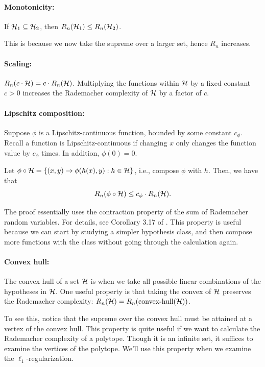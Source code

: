 \paragraph{Monotonicity:} If $\mathcal{H}_1 \subseteq \mathcal{H}_2$, then $R_n(\mathcal{H}_1) \le R_n(\mathcal{H}_2)$.

This is because we now take the supreme over a larger set, hence $R_n$ increases.

\paragraph{Scaling:} $R_n(c\cdot \mathcal{H}) = c\cdot R_n(\mathcal{H})$. Multiplying the functions within $\mathcal{H}$ by a fixed constant $c > 0$ increases the Rademacher complexity of $\mathcal{H}$ by a factor of $c$.

\paragraph{Lipschitz composition:} Suppose $\phi$ is a Lipschitz-continuous function, bounded by some constant $c_{\phi}$. Recall a function is Lipschitz-continuous if changing $x$ only changes the function value by $c_{\phi}$ times.  In addition, $\phi(0) = 0$.

Let $\phi \circ \mathcal{H} =  \left\{(x, y) \rightarrow \phi(h(x), y) : h \in \mathcal{H}\right\}$, i.e., compose $\phi$ with $h$.
Then, we have that \[ R_n(\phi \circ \mathcal{H}) \le c_{\phi} \cdot R_n(\mathcal{H}). \]

The proof essentially uses the contraction property of the sum of Rademacher random variables.
For details, see Corollary 3.17 of \cite{ledoux2013probability}.
This property is useful because we can start by studying a simpler hypothesis class, and then compose more functions with the class without going through the calculation again.

\paragraph{Convex hull:} The convex hull of a set $\mathcal{H}$ is when we take all possible linear combinations of the hypotheses in $\mathcal{H}$.
One useful property is that taking the convex of $\mathcal{H}$ preserves the Rademacher complexity: $R_n(\mathcal{H}) = R_n(\textup{convex-hull}(\mathcal{H}))$.

To see this, notice that the supreme over the convex hull must be attained at a vertex of the convex hull.
This property is quite useful if we want to calculate the Rademacher complexity of a polytope. Though it is an infinite set, it suffices to examine the vertices of the polytope. We'll use this property when we examine the $\ell_1$-regularization.

